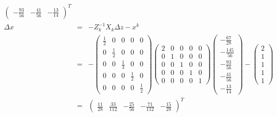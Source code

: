 \documentclass[a4paper,11pt]{jsarticle}
\numberwithin{theorem}{section}  %
\numberwithin{equation}{section} %
\begin{document}
\begin{eqnarray*}
\begin{pmatrix}
-\frac{93}{56}&
-\frac{41}{56}&
-\frac{13}{14}
\end{pmatrix}^T\\
\Delta x&=& -Z_k^{-1}X_k\Delta z - x^k\\
&=&
-\begin{pmatrix}
\frac{1}{2} & 0 & 0 & 0 & 0\\
0 & \frac{1}{2} & 0 & 0 & 0\\
0 & 0 & \frac{1}{3} & 0 & 0\\
0 & 0 & 0 & \frac{1}{2} & 0\\
0 & 0 & 0 & 0 & \frac{1}{2}
\end{pmatrix}
\begin{pmatrix}
2 & 0 & 0 & 0 & 0\\
0 & 1 & 0 & 0 & 0\\
0 & 0 & 1 & 0 & 0\\
0 & 0 & 0 & 1 & 0\\
0 & 0 & 0 & 0 & 1
\end{pmatrix}
\begin{pmatrix}
-\frac{67}{28}\\
-\frac{145}{56}\\
-\frac{93}{56}\\
-\frac{41}{56}\\
-\frac{13}{14}
\end{pmatrix}
-
\begin{pmatrix}
2\\1\\1\\1\\1
\end{pmatrix}
 \\
&=& \begin{pmatrix}
\frac{11}{28}&
\frac{33}{112}&
-\frac{25}{56}&
-\frac{71}{112}&
-\frac{15}{28}
\end{pmatrix}^T\\ 
\end{eqnarray*}
\end{document}
